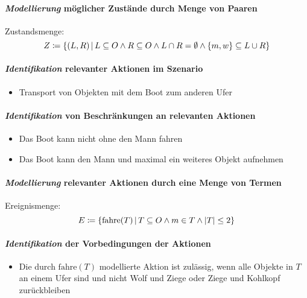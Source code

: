 			\paragraph{\textit{Modellierung} möglicher Zustände durch Menge von Paaren}
				Zustandsmenge:
				\[ Z \coloneqq \{ (L, R) \,\vert\, L \subseteq O \land R \subseteq O \land L \cap R = \emptyset \land \{ m, w \} \subseteq L \cup R \} \]

			\paragraph{\textit{Identifikation} relevanter Aktionen im Szenario}
				\begin{itemize}
					\item Transport von Objekten mit dem Boot zum anderen Ufer
				\end{itemize}

			\paragraph{\textit{Identifikation} von Beschränkungen an relevanten Aktionen}
				\begin{itemize}
					\item Das Boot kann nicht ohne den Mann fahren
					\item Das Boot kann den Mann und maximal ein weiteres Objekt aufnehmen
				\end{itemize}

			\paragraph{\textit{Modellierung} relevanter Aktionen durch eine Menge von Termen}
				Ereignismenge:
				\[ E \coloneqq \{ \text{fahre}(T) \,\vert\, T \subseteq O \land m \in T \land \abs{T} \leq 2 \} \]

			\paragraph{\textit{Identifikation} der Vorbedingungen der Aktionen}
				\begin{itemize}
					\item Die durch $ \text{fahre}(T) $ modellierte Aktion ist zulässig, wenn alle Objekte in $ T $ an einem Ufer sind und nicht Wolf und Ziege oder Ziege und Kohlkopf zurückbleiben
				\end{itemize}

